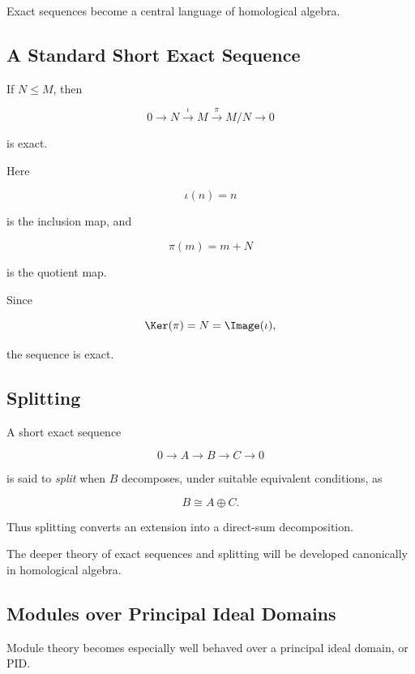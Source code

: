 Exact sequences become a central language of homological algebra.

\subsection{A Standard Short Exact Sequence}
\label{subsec:standard-short-exact-sequence}

If \(N\leq M\), then

\[ 0\longrightarrow N\xrightarrow{\iota}M\xrightarrow{\pi}M/N\longrightarrow0 \]

is exact.

Here

\[ \iota(n)=n \]

is the inclusion map, and

\[ \pi(m)=m+N \]

is the quotient map.

Since

\[ \Ker(\pi)=N=\Image(\iota), \]

the sequence is exact.

\subsection{Splitting}
\label{subsec:module-splitting}

A short exact sequence

\[ 0\to A\to B\to C\to0 \]

is said to \emph{split} when \(B\) decomposes, under suitable equivalent
conditions, as

\[ B\cong A\oplus C. \]

Thus splitting converts an extension into a direct-sum decomposition.

The deeper theory of exact sequences and splitting will be developed
canonically in homological algebra.

\subsection{Modules over Principal Ideal Domains}
\label{subsec:modules-pids}

Module theory becomes especially well behaved over a principal ideal domain,
or PID.

